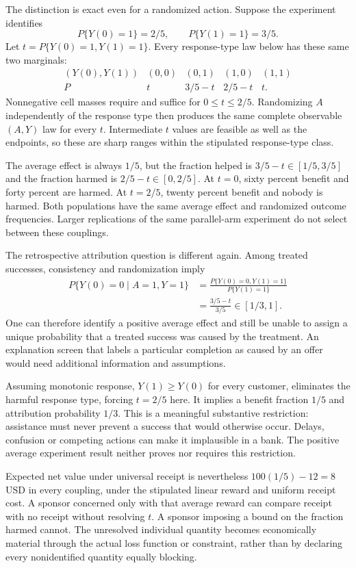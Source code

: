The distinction is exact even for a randomized action. Suppose the
experiment identifies
\[
 P\{Y(0)=1\}=2/5,\qquad P\{Y(1)=1\}=3/5.
\]
Let $t=P\{Y(0)=1,Y(1)=1\}$. Every response-type law below has these
same two marginals:
\[
\begin{array}{c|cccc}
(Y(0),Y(1))&(0,0)&(0,1)&(1,0)&(1,1)\\ \hline
P&t&3/5-t&2/5-t&t .
\end{array}
\]
Nonnegative cell masses require and suffice for $0\le t\le2/5$.
Randomizing $A$ independently of the response type then produces
the same complete observable $(A,Y)$ law for every $t$.
Intermediate $t$ values are feasible as well as the endpoints,
so these are sharp ranges within the stipulated response-type
class.~\citep{exec17_s3_exact}

The average effect is always $1/5$, but the fraction helped is
$3/5-t\in[1/5,3/5]$ and the fraction harmed is
$2/5-t\in[0,2/5]$. At $t=0$, sixty percent benefit and forty
percent are harmed. At $t=2/5$, twenty percent benefit and nobody
is harmed. Both populations have the same average effect and
randomized outcome frequencies. Larger replications of the same
parallel-arm experiment do not select between these couplings.

The retrospective attribution question is different again. Among
treated successes, consistency and randomization imply
\begin{align*}
 P\{Y(0)=0\mid A=1,Y=1\}
 &=\frac{P\{Y(0)=0,Y(1)=1\}}{P\{Y(1)=1\}}\\
 &=\frac{3/5-t}{3/5}\in[1/3,1].
\end{align*}
One can therefore identify a positive average effect and still be
unable to assign a unique probability that a treated success was
caused by the treatment. An explanation screen that labels a
particular completion as caused by an offer would need additional
information and assumptions.

Assuming monotonic response, $Y(1)\ge Y(0)$ for every customer,
eliminates the harmful response type, forcing $t=2/5$ here.
It implies a benefit fraction $1/5$ and attribution probability
$1/3$. This is a meaningful substantive restriction: assistance
must never prevent a success that would otherwise occur. Delays,
confusion or competing actions can make it implausible in a bank.
The positive average experiment result neither proves nor requires
this restriction.

Expected net value under universal receipt is nevertheless
$100(1/5)-12=8$ USD in every coupling, under the stipulated linear
reward and uniform receipt cost. A sponsor concerned only with
that average reward can compare receipt with no receipt without
resolving $t$. A sponsor imposing a bound on the fraction harmed
cannot. The unresolved individual quantity becomes economically
material through the actual loss function or constraint, rather
than by declaring every nonidentified quantity equally blocking.


